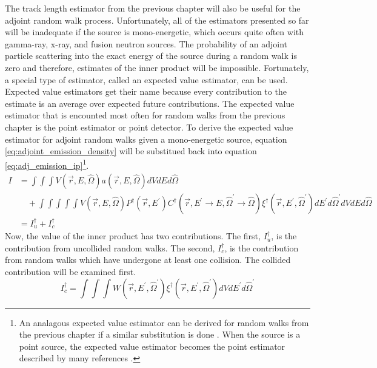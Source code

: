 The track length estimator from the previous chapter will also be useful for the
adjoint random walk process. Unfortunately, all of the estimators presented so
far will be inadequate if the source is mono-energetic, which occurs quite often
with gamma-ray, x-ray, and fusion neutron sources. The probability of an adjoint
particle scattering into the exact energy of the source during a random walk is 
zero and therefore, estimates of the inner product will be impossible. 
Fortunately, a special type of estimator, called an expected value estimator, 
can be used. Expected value estimators get their name because every 
contribution to the estimate is an average over expected future contributions. 
The expected value estimator that is encounted most often for random walks from
the previous chapter is the point estimator or point detector. To derive the 
expected value estimator for adjoint random walks given a mono-energetic source,
equation \ref{eq:adjoint_emission_density} will be substitued back into 
equation \ref{eq:adj_emission_ip}\footnote{An analagous expected value estimator
can be derived for random walks from the previous chapter if a similar
substitution is done \citep{spanier_monte_1969}. When the source is a point 
source, the expected value estimator becomes the point estimator described by
many references \citep{x-5_monte_carlo_team_mcnp_2003, kalos_estimation_1963}.}.
\begin{align}
  I & = \int\int\int V(\vec{r},E,\hat{\Omega})a(\vec{r},E,\hat{\Omega})
  dVdEd\hat{\Omega} \nonumber \\  
  & \quad + \int\int\int\int\int V(\vec{r},E,\hat{\Omega})
  P^{\dagger}(\vec{r},E^{'}) 
  C^{\dagger}(\vec{r},E^{'} \to E, \hat{\Omega}^{'} \to \hat{\Omega})
  \xi^{\dagger}(\vec{r},E^{'},\hat{\Omega}^{'})dE^{'}d\hat{\Omega}^{'}dVdE
  d\hat{\Omega} \nonumber \\
  & = I_u^{\dagger} + I_c^{\dagger} \nonumber
\end{align}
Now, the value of the inner product has two contributions. The first, 
$I_u^{\dagger}$, is the contribution from uncollided random walks. The second,
$I_c^{\dagger}$, is the contribution from random walks which have undergone at
least one collision. The collided contribution will be examined first.
\begin{equation*}
  I_c^{\dagger} = \int\int\int W(\vec{r},E^{'},\hat{\Omega}^{'})
  \xi^{\dagger}(\vec{r},E^{'},\hat{\Omega}^{'}) dVdE^{'}d\hat{\Omega}^{'}
\end{equation*}
